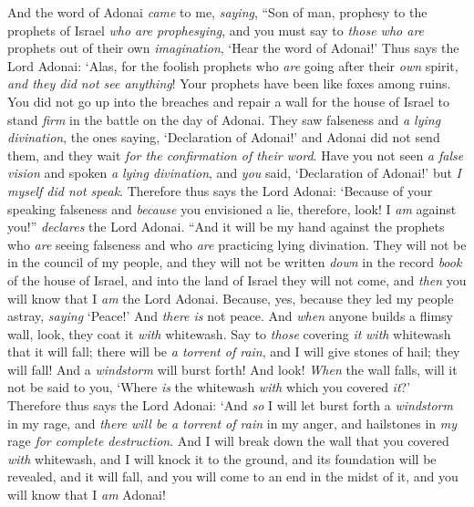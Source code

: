 \begin{biblechapter} %
 And the word of Adonai \textit{came} to me, \textit{saying},
\verse “Son of man, prophesy to the prophets of Israel \textit{who are prophesying}, and you must say to \textit{those who are} prophets out of their own \textit{imagination}, ‘Hear the word of Adonai!’
\verse Thus says the Lord Adonai: ‘Alas, for the foolish prophets who \textit{are} going after their \textit{own} spirit, \textit{and they did not see anything}!
\verse Your prophets have been like foxes among ruins.
\verse You did not go up into the breaches and repair a wall for the house of Israel to stand \textit{firm} in the battle on the day of Adonai.
\verse They saw falseness and \textit{a lying divination}, the ones saying, ‘Declaration of Adonai!’ and Adonai did not send them, and they wait \textit{for the confirmation of their word}.
\verse Have you not seen \textit{a false vision} and spoken \textit{a} \textit{lying divination}, and \textit{you} said, ‘Declaration of Adonai!’ but \textit{I myself did not speak}.
\verse Therefore thus says the Lord Adonai: ‘Because of your speaking falseness and \textit{because} you envisioned a lie, therefore, look! I \textit{am} against you!” \textit{declares} the Lord Adonai.
\verse “And it will be my hand against the prophets who \textit{are} seeing falseness and who \textit{are} practicing lying divination. They will not be in the council of my people, and they will not be written \textit{down} in the record \textit{book} of the house of Israel, and into the land of Israel they will not come, and \textit{then} you will know that I \textit{am} the Lord Adonai.
\verse Because, yes, because they led my people astray, \textit{saying} ‘Peace!’ And \textit{there is} not peace. And \textit{when} anyone builds a flimsy wall, look, they coat it \textit{with} whitewash.
\verse Say to \textit{those} covering \textit{it} \textit{with} whitewash that it will fall; there will be \textit{a torrent of rain}, and I will give stones of hail; they will fall!  And a \textit{windstorm} will burst forth!
\verse And look! \textit{When} the wall falls, will it not be said to you, ‘Where \textit{is} the whitewash \textit{with} which you covered \textit{it}?’
\verse Therefore thus says the Lord Adonai: ‘And \textit{so} I will let burst forth a \textit{windstorm} in my rage, and \textit{there will be a torrent of rain} in my anger, and hailstones in \textit{my} rage \textit{for complete destruction}.
\verse And I will break down the wall that you covered \textit{with} whitewash, and I will knock it to the ground, and its foundation will be revealed, and it will fall, and you will come to an end in the midst of it, and you will know that I \textit{am} Adonai!

\end{biblechapter}
